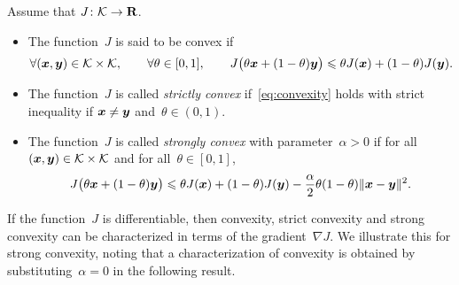 \begin{definition}
    [Convexity]
    Assume that $J\colon \mathcal K \to \mathbf R$.
    \begin{itemize}
        \item
            The function~$J$ is said to be convex if
            \begin{equation}
                \label{eq:convexity}
                \forall (\mathbf{\boldsymbol{x}}, \mathbf{\boldsymbol{y}}) \in \mathcal K \times \mathcal K,
                \qquad \forall \theta \in [0, 1],
                \qquad
                J\bigl(\theta \mathbf{\boldsymbol{x}} + (1 - \theta) \mathbf{\boldsymbol{y}}\bigr)
                \leqslant \theta J(\mathbf{\boldsymbol{x}}) + (1 - \theta) J(\mathbf{\boldsymbol{y}}).
            \end{equation}

        \item
            The function~$J$ is called \emph{strictly convex} if~\eqref{eq:convexity} holds with strict inequality
            if $\mathbf{\boldsymbol{x}} \neq \mathbf{\boldsymbol{y}}$ and~$\theta \in (0, 1)$.

        \item
            The function~$J$ is called \emph{strongly convex} with parameter~$\alpha > 0$ if
            for all $(\mathbf{\boldsymbol{x}}, \mathbf{\boldsymbol{y}}) \in \mathcal K \times \mathcal K$ and for all~$\theta \in [0, 1]$,
            \begin{equation}
                \label{eq:strong_convexity}
                J\bigl(\theta \mathbf{\boldsymbol{x}} + (1 - \theta) \mathbf{\boldsymbol{y}}\bigr)
                \leqslant \theta J(\mathbf{\boldsymbol{x}}) + (1 - \theta) J(\mathbf{\boldsymbol{y}})
                - \frac{\alpha}{2} \theta (1 - \theta) \lVert\mathbf{\boldsymbol{x}} - \mathbf{\boldsymbol{y}}\rVert^2.
            \end{equation}
    \end{itemize}
\end{definition}

If the function~$J$ is differentiable,
then convexity, strict convexity and strong convexity can be characterized in terms of the gradient~$\nabla J$.
We illustrate this for strong convexity,
noting that a characterization of convexity is obtained by substituting~$\alpha = 0$ in the following result.

